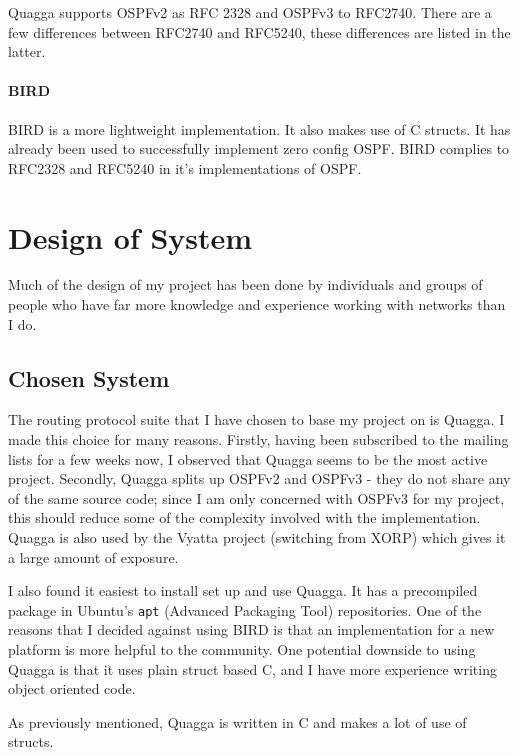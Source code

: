 \documentclass[12pt]{report}
\begin{document}
Quagga supports OSPFv2 as RFC 2328 and OSPFv3 to RFC2740. There are a few
differences between RFC2740 and RFC5240, these differences are listed in the
latter.

\subsubsection{BIRD}
BIRD is a more lightweight implementation. It also makes use of C
structs. It has already been used to successfully implement zero config OSPF. 
BIRD complies to RFC2328 and RFC5240 in it's implementations of OSPF. 

\chapter{Design of System}
Much of the design of my project has been done by individuals and groups of
people who have far more knowledge and experience working with networks than I
do. 

\section{Chosen System}
The routing protocol suite that I have chosen to base my project on is Quagga. I
made this choice for many reasons. Firstly, having been subscribed to the
mailing lists for a few weeks now, I observed that Quagga seems to be the most
active project. Secondly, Quagga splits up OSPFv2 and OSPFv3 - they do not share
any of the same source code; since I am only concerned with OSPFv3 for my
project, this should reduce some of the complexity involved with the
implementation. Quagga is also used by the Vyatta project (switching from XORP)
which gives it a large amount of exposure. 

I also found it easiest to install set up and use Quagga. It has a precompiled
package in Ubuntu's \texttt{apt} (Advanced Packaging Tool) repositories. One of
the reasons that I decided against using BIRD is that an implementation for a
new platform is more helpful to the community. One potential downside to using
Quagga is that it uses plain struct based C, and I have more experience writing
object oriented code. 



As previously mentioned, Quagga is written in C and makes a lot of use of
structs.
\end{document}
